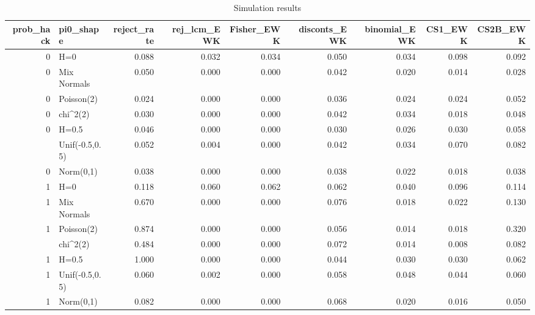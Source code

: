 \begin{table}

\caption{Simulation results}
\centering
\begin{tabular}[t]{rlrrrrrrr}
\toprule
prob_hack & pi0_shape & reject_rate & rej_lcm_EWK & Fisher_EWK & disconts_EWK & binomial_EWK & CS1_EWK & CS2B_EWK\\
\midrule
0 & H=0 & 0.088 & 0.032 & 0.034 & 0.050 & 0.034 & 0.098 & 0.092\\
0 & Mix Normals & 0.050 & 0.000 & 0.000 & 0.042 & 0.020 & 0.014 & 0.028\\
0 & Poisson(2) & 0.024 & 0.000 & 0.000 & 0.036 & 0.024 & 0.024 & 0.052\\
0 & chi^2(2) & 0.030 & 0.000 & 0.000 & 0.042 & 0.034 & 0.018 & 0.048\\
0 & H=0.5 & 0.046 & 0.000 & 0.000 & 0.030 & 0.026 & 0.030 & 0.058\\
\addlinespace
0 & Unif(-0.5,0.5) & 0.052 & 0.004 & 0.000 & 0.042 & 0.034 & 0.070 & 0.082\\
0 & Norm(0,1) & 0.038 & 0.000 & 0.000 & 0.038 & 0.022 & 0.018 & 0.038\\
1 & H=0 & 0.118 & 0.060 & 0.062 & 0.062 & 0.040 & 0.096 & 0.114\\
1 & Mix Normals & 0.670 & 0.000 & 0.000 & 0.076 & 0.018 & 0.022 & 0.130\\
1 & Poisson(2) & 0.874 & 0.000 & 0.000 & 0.056 & 0.014 & 0.018 & 0.320\\
\addlinespace
1 & chi^2(2) & 0.484 & 0.000 & 0.000 & 0.072 & 0.014 & 0.008 & 0.082\\
1 & H=0.5 & 1.000 & 0.000 & 0.000 & 0.044 & 0.030 & 0.030 & 0.062\\
1 & Unif(-0.5,0.5) & 0.060 & 0.002 & 0.000 & 0.058 & 0.048 & 0.044 & 0.060\\
1 & Norm(0,1) & 0.082 & 0.000 & 0.000 & 0.068 & 0.020 & 0.016 & 0.050\\
\bottomrule
\end{tabular}
\end{table}
